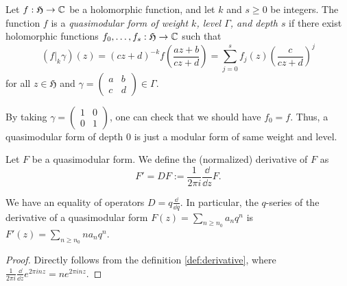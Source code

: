 \begin{definition}\label{def:quasimodform}
Let $f: \mathfrak{H} \to \mathbb{C}$ be a holomorphic function, and let $k$ and $s \ge 0$ be integers.
The function $f$ is a \emph{quasimodular form of weight $k$, level $\Gamma$, and depth $s$} if there exist holomorphic functions $f_0, \dots, f_s : \mathfrak{H} \to \mathbb{C}$ such that
\begin{equation}\label{eqn:quasimod-def}
    (f|_{k}\gamma)(z) = (cz + d)^{-k} f\left(\frac{az + b}{cz + d}\right) = \sum_{j=0}^{s} f_j(z) \left(\frac{c}{cz + d}\right)^j
\end{equation}
for all $z \in \mathfrak{H}$ and $\gamma = \left(\begin{smallmatrix} a&b\\c&d \end{smallmatrix}\right) \in \Gamma$.
\end{definition}

By taking $\gamma = \left(\begin{smallmatrix} 1 & 0 \\ 0 & 1 \end{smallmatrix}\right)$, one can check that we should have $f_0 = f$. Thus, a quasimodular form of depth $0$ is just a modular form of same weight and level.


\begin{definition}\label{def:derivative}
Let $F$ be a quasimodular form.
We define the (normalized) derivative of $F$ as
\begin{equation}\label{eqn:derivative}
    F' = DF := \frac{1}{2\pi i} \frac{\dd}{\dd z} F.
\end{equation}
\end{definition}

\begin{lemma}\label{lemma:der-q-series}
We have an equality of operators $D = q \frac{\dd}{\dd q}$.
In particular, the $q$-series of the derivative of a quasimodular form $F(z) = \sum_{n \ge n_0} a_n q^n$ is $F'(z) = \sum_{n \ge n_0} n a_n q^n$.
\end{lemma}
\begin{proof}
Directly follows from the definition \eqref{def:derivative}, where $\frac{1}{2 \pi i}\frac{\dd}{\dd z}e^{2\pi i n z} = n e^{2\pi i n z}$.
\end{proof}

